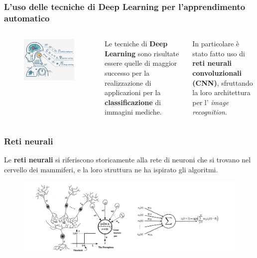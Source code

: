 \documentclass{beamer}
\begin{document}
\begin{frame}
	\frametitle{L'uso delle tecniche di Deep Learning per l'apprendimento automatico
	}
	\begin{columns}
		\begin{figure}
			\includegraphics[width=\textwidth]{learning.png}
		\end{figure}
		Le tecniche di \textbf{Deep Learning} sono risultate essere quelle di maggior successo per la realizzazione di applicazioni per la \textbf{classificazione} di immagini mediche.
	
	In particolare è stato fatto uso di \textbf{reti neurali convoluzionali (CNN)}, sfruttando la loro architettura per l'
	\emph{image recognition}.
	\end{columns}
\end{frame}

\begin{frame}
	\frametitle{Reti neurali}
	Le \textbf{reti neurali} si riferiscono storicamente alla rete di neuroni che si trovano nel cervello 
	dei mammiferi, e la loro struttura ne ha ispirato gli algoritmi.
	\medskip
	\begin{figure}
		\includegraphics[width=1\textwidth]{confronto neurone biologico-artificiale.PNG}
	\end{figure}
\end{frame}
\end{document}

